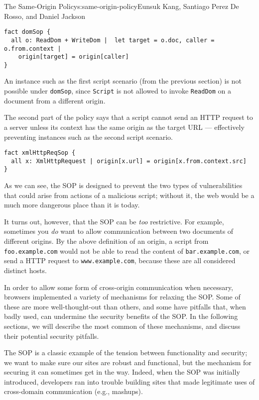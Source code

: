 \begin{aosachapter}{The Same-Origin Policy}{s:same-origin-policy}{Eunsuk Kang, Santiago Perez De Rosso, and Daniel Jackson}
\begin{verbatim}
fact domSop {
  all o: ReadDom + WriteDom |  let target = o.doc, caller = o.from.context |
    origin[target] = origin[caller] 
}
\end{verbatim}

An instance such as the first script scenario (from the previous
section) is not possible under \texttt{domSop}, since \texttt{Script} is
not allowed to invoke \texttt{ReadDom} on a document from a different
origin.

The second part of the policy says that a script cannot send an HTTP
request to a server unless its context has the same origin as the target
URL --- effectively preventing instances such as the second script
scenario.

\begin{verbatim}
fact xmlHttpReqSop { 
  all x: XmlHttpRequest | origin[x.url] = origin[x.from.context.src] 
}
\end{verbatim}

As we can see, the SOP is designed to prevent the two types of
vulnerabilities that could arise from actions of a malicious script;
without it, the web would be a much more dangerous place than it is
today.

It turns out, however, that the SOP can be \emph{too} restrictive. For
example, sometimes you \emph{do} want to allow communication between two
documents of different origins. By the above definition of an origin, a
script from \texttt{foo.example.com} would not be able to read the
content of \texttt{bar.example.com}, or send a HTTP request to
\texttt{www.example.com}, because these are all considered distinct
hosts.

In order to allow some form of cross-origin communication when
necessary, browsers implemented a variety of mechanisms for relaxing the
SOP. Some of these are more well-thought-out than others, and some have
pitfalls that, when badly used, can undermine the security benefits of
the SOP. In the following sections, we will describe the most common of
these mechanisms, and discuss their potential security pitfalls.

\label{techniques-for-bypassing-the-sop}

The SOP is a classic example of the tension between functionality and
security; we want to make sure our sites are robust and functional, but
the mechanism for securing it can sometimes get in the way. Indeed, when
the SOP was initially introduced, developers ran into trouble building
sites that made legitimate uses of cross-domain communication (e.g.,
mashups).


\end{aosachapter}
